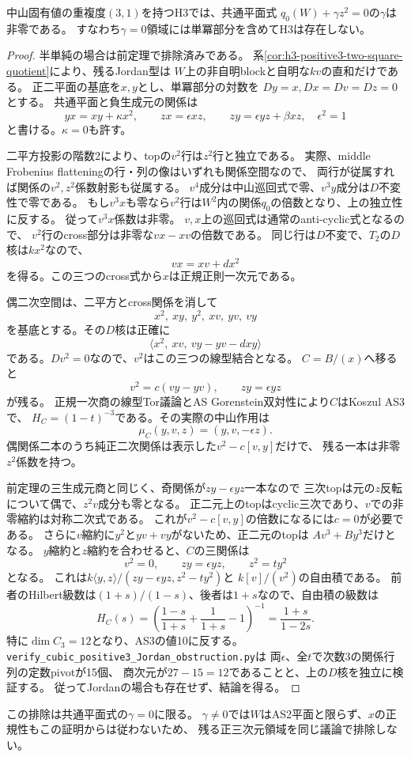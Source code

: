 \begin{theorem}[正三次元の$\gamma=0$領域は全て排除される]
\label{thm:h3-positive3-gamma-zero-exclusion}
中山固有値の重複度$(3,1)$を持つH3では、共通平面式
$q_0(W)+\gamma z^2=0$の$\gamma$は非零である。
すなわち$\gamma=0$領域には単冪部分を含めてH3は存在しない。
\end{theorem}
\begin{proof}
半単純の場合は前定理で排除済みである。
系\ref{cor:h3-positive3-two-square-quotient}により、残るJordan型は
$W$上の非自明blockと自明な$kv$の直和だけである。
正二平面の基底を$x,y$とし、単冪部分の対数を
$Dy=x,Dx=Dv=Dz=0$とする。
共通平面と負生成元の関係は
\[
 yx=xy+\kappa x^2,\qquad
 zx=\epsilon xz,\qquad zy=\epsilon yz+\beta xz,
 \quad\epsilon^2=1
\]
と書ける。$\kappa=0$も許す。

二平方投影の階数2により、topの$v^2$行は$z^2$行と独立である。
実際、middle Frobenius flatteningの行・列の像はいずれも関係空間なので、
両行が従属すれば関係の$v^2,z^2$係数射影も従属する。
$v^4$成分は中山巡回式で零、$v^3y$成分は$D$不変性で零である。
もし$v^3x$も零なら$v^2$行は$W^2$内の関係$q_0$の倍数となり、上の独立性に反する。
従って$v^3x$係数は非零。
$v,x$上の巡回式は通常のanti-cyclic式となるので、
$v^2$行のcross部分は非零な$vx-xv$の倍数である。
同じ行は$D$不変で、$T_2$の$D$核は$kx^2$なので、
\[
 vx=xv+d x^2
\]
を得る。この三つのcross式から$x$は正規正則一次元である。

偶二次空間は、二平方とcross関係を消して
\[
 x^2,\ xy,\ y^2,\ xv,\ yv,\ vy
\]
を基底とする。その$D$核は正確に
\[
 \langle x^2,\ xv,\ vy-yv-dxy\rangle
\]
である。$Dv^2=0$なので、$v^2$はこの三つの線型結合となる。
$C=B/(x)$へ移ると
\[
 v^2=c(vy-yv),\qquad zy=\epsilon yz
\]
が残る。
正規一次商の線型Tor議論とAS Gorenstein双対性により$C$はKoszul AS3で、
$H_C=(1-t)^{-3}$である。その実際の中山作用は
\[
 \mu_C(y,v,z)=(y,v,-\epsilon z).
\]
偶関係二本のうち純正二次関係は表示した$v^2-c[v,y]$だけで、
残る一本は非零$z^2$係数を持つ。

前定理の三生成元商と同じく、奇関係が$zy-\epsilon yz$一本なので
三次topは元の$z$反転について偶で、$z^2v$成分も零となる。
正二元上のtopはcyclic三次であり、$v$での非零縮約は対称二次式である。
これが$v^2-c[v,y]$の倍数になるには$c=0$が必要である。
さらに$v$縮約に$y^2$と$yv+vy$がないため、正二元のtopは
$Av^3+By^3$だけとなる。
$y$縮約と$z$縮約を合わせると、$C$の三関係は
\[
 v^2=0,\qquad zy=\epsilon yz,\qquad z^2=t y^2
\]
となる。
これは$k\langle y,z\rangle/(zy-\epsilon yz,z^2-ty^2)$と
$k[v]/(v^2)$の自由積である。
前者のHilbert級数は$(1+s)/(1-s)$、後者は$1+s$なので、自由積の級数は
\[
 H_C(s)=\left(\frac{1-s}{1+s}+\frac1{1+s}-1\right)^{-1}
       =\frac{1+s}{1-2s}.
\]
特に$\dim C_3=12$となり、AS3の値10に反する。
\texttt{verify\_\allowbreak{}cubic\_\allowbreak{}positive3\_\allowbreak{}Jordan\_\allowbreak{}obstruction.py}は
両$\epsilon$、全$t$で次数3の関係行列の定数pivotが15個、
商次元が$27-15=12$であることと、上の$D$核を独立に検証する。
従ってJordanの場合も存在せず、結論を得る。
\end{proof}

この排除は共通平面式の$\gamma=0$に限る。
$\gamma\ne0$では$W$はAS2平面と限らず、$x$の正規性もこの証明からは従わないため、
残る正三次元領域を同じ議論で排除しない。
